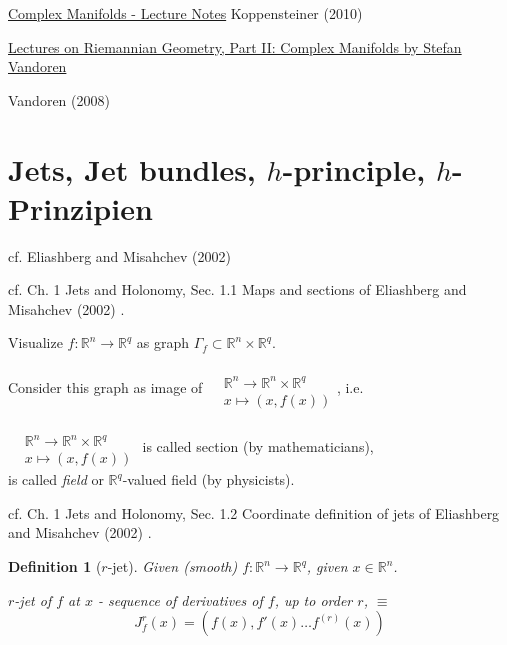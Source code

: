 \documentclass[10pt]{amsart}
\newtheorem{definition}{Definition}
\begin{document}
\begin{multicols*}{2}
\href{http://www.caramdir.at/uploads/math/piii-cm/complex-manifolds.pdf}{Complex Manifolds - Lecture Notes}
Koppensteiner (2010) \cite{Kopp2010}


\href{http://www.staff.science.uu.nl/~vando101/MRIlectures.pdf}{Lectures on Riemannian Geometry, Part II: Complex Manifolds by Stefan Vandoren}

Vandoren (2008) \cite{Vand2008}

\part{Jets, Jet bundles, $h$-principle, $h$-Prinzipien}

cf. Eliashberg and Misahchev (2002) \cite{ElMi2002}

cf. Ch. 1 Jets and Holonomy, Sec. 1.1 Maps and sections of Eliashberg and Misahchev (2002) \cite{ElMi2002}.  

Visualize $f:\mathbb{R}^n \to \mathbb{R}^q$ as graph $\Gamma_f \subset \mathbb{R}^n \times \mathbb{R}^q$.  

Consider this graph as image of $\begin{aligned} & \quad \\ 
	& \mathbb{R}^n \to \mathbb{R}^n \times \mathbb{R}^q \\
	& x \mapsto (x,f(x)) \end{aligned}$, i.e. 

$\begin{aligned} & \quad \\ 
	& \mathbb{R}^n \to \mathbb{R}^n \times \mathbb{R}^q \\
	& x \mapsto (x,f(x)) \end{aligned}$ is called section (by mathematicians), \\
is called \emph{field} or $\mathbb{R}^q$-valued field (by physicists).  

cf. Ch. 1 Jets and Holonomy, Sec. 1.2 Coordinate definition of jets of Eliashberg and Misahchev (2002) \cite{ElMi2002}.  

\begin{definition}[$r$-jet]
Given (smooth) $f: \mathbb{R}^n \to \mathbb{R}^q$, given $x\in \mathbb{R}^n$.  

$r$-jet of $f$ at $x$ - sequence of derivatives of $f$, up to order $r$, $\equiv$ 
\begin{equation}
J^r_f(x) = (f(x),f'(x) \dots f^{(r)}(x) )
\end{equation}
\end{definition}


\end{multicols*}
\end{document}
